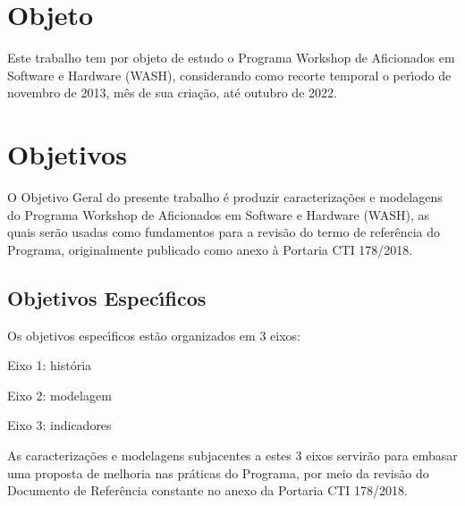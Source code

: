 \documentclass[
12pt,		%
openright,	%
twoside,  %
a4paper,			%
chapter=TITLE,		%
english,			%
french,				%
spanish,			%
brazil				%
]{USPSC-classe/USPSC}
\begin{document}
\section[Objeto]{Objeto}\label{Objeto}
Este trabalho tem por objeto de estudo o Programa Workshop de Aficionados em Software e Hardware (WASH), considerando como recorte temporal o per\'{\i}odo de  novembro de 2013, m\^es de sua cria\c{c}\~ao, at\'e outubro de 2022.









\section[Objetivos]{Objetivos}\label{Objetivos}
O Objetivo Geral do presente trabalho \'e produzir caracteriza\c{c}\~oes e modelagens do Programa Workshop de Aficionados em Software e Hardware (WASH), as quais ser\~ao usadas como fundamentos para a revis\~ao do termo de refer\^encia do Programa, originalmente publicado como anexo \`a Portaria CTI 178/2018.









\subsection[Objetivos Espec\'{\i}ficos]{Objetivos Espec\'{\i}ficos}\label{Objetivos Espec\'{\i}ficos}
Os objetivos espec\'{\i}ficos est\~ao organizados em 3 eixos:










\begin{alineas}
\item Eixo 1: hist\'oria
\item Eixo 2: modelagem
\item Eixo 3: indicadores
\end{alineas}

As caracteriza\c{c}\~oes e modelagens subjacentes a estes 3 eixos servir\~ao para embasar uma proposta de melhoria nas pr\'aticas do Programa, por meio da revis\~ao do Documento de Refer\^encia constante no anexo da Portaria CTI 178/2018.
\end{document}
